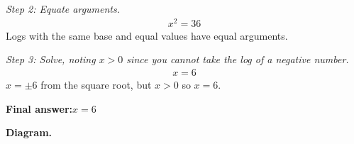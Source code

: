 \documentclass[11pt]{article}
\begin{document}
\textit{Step 2: Equate arguments.}
\[\begin{gathered}
x^2 = 36
\end{gathered}\]
Logs with the same base and equal values have equal arguments.

\textit{Step 3: Solve, noting \( x > 0 \) since you cannot take the log of a negative number.}
\[\begin{gathered}
x = 6
\end{gathered}\]
\( x = \pm 6 \) from the square root, but \( x > 0 \) so \( x = 6 \).

\begin{answerbox}
\textbf{Final answer:}\quad \(\displaystyle  x = 6 \)
\end{answerbox}
\textbf{Diagram.}

\begin{center}
\end{center}
\end{document}
